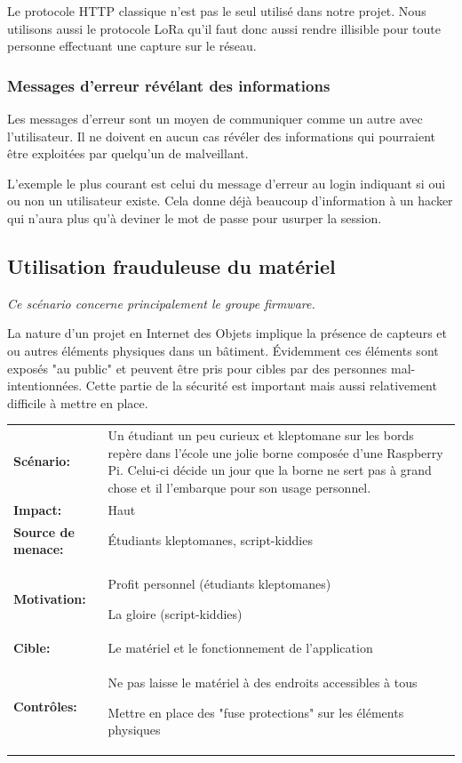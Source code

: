 \documentclass[12pt]{article}
\begin{document}
Le protocole HTTP classique n'est pas le seul utilisé dans notre projet. Nous utilisons aussi le protocole LoRa qu'il faut donc aussi rendre illisible pour toute personne effectuant une capture sur le réseau.

\subsubsection{Messages d'erreur révélant des informations}

Les messages d'erreur sont un moyen de communiquer comme un autre avec l'utilisateur. Il ne doivent en aucun cas révéler des informations qui pourraient être exploitées par quelqu'un de malveillant.

L'exemple le plus courant est celui du message d'erreur au login indiquant si oui ou non un utilisateur existe. Cela donne déjà beaucoup d'information à un hacker qui n'aura plus qu'à deviner le mot de passe pour usurper la session.
\clearpage

\subsection{Utilisation frauduleuse du matériel}

\emph{Ce scénario concerne principalement le groupe firmware.}
\medskip

La nature d'un projet en Internet des Objets implique la présence de capteurs et ou autres éléments physiques dans un bâtiment. Évidemment ces éléments sont exposés "au public" et peuvent être pris pour cibles par des personnes mal-intentionnées. Cette partie de la sécurité est important mais aussi relativement difficile à mettre en place.
\medskip

\renewcommand{\arraystretch}{1.6}
\begin{tabular}{@{}p{4cm}p{12cm}}
\textbf{Scénario:} &  Un étudiant un peu curieux et kleptomane sur les bords repère dans l'école une jolie borne composée d'une Raspberry Pi. Celui-ci décide un jour que la borne ne sert pas à grand chose et il l'embarque pour son usage personnel.\\
\textbf{Impact:} & Haut \\
\textbf{Source de menace: } & Étudiants kleptomanes, script-kiddies \\
\textbf{Motivation:} & Profit personnel (étudiants kleptomanes)

La gloire (script-kiddies)\\
\textbf{Cible:} & Le matériel et le fonctionnement de l'application \\
\textbf{Contrôles:} & Ne pas laisse le matériel à des endroits accessibles à tous

Mettre en place des "fuse protections" sur les éléments physiques
\end{tabular}
\renewcommand{\arraystretch}{1}
\end{document}

